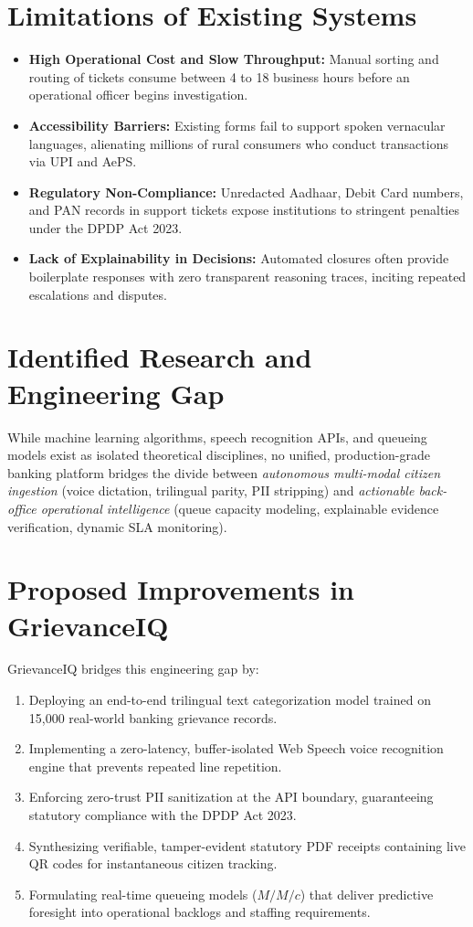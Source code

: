 \section{Limitations of Existing Systems}
\begin{itemize}
    \item \textbf{High Operational Cost and Slow Throughput:} Manual sorting and routing of tickets consume between 4 to 18 business hours before an operational officer begins investigation.
    \item \textbf{Accessibility Barriers:} Existing forms fail to support spoken vernacular languages, alienating millions of rural consumers who conduct transactions via UPI and AePS.
    \item \textbf{Regulatory Non-Compliance:} Unredacted Aadhaar, Debit Card numbers, and PAN records in support tickets expose institutions to stringent penalties under the DPDP Act 2023.
    \item \textbf{Lack of Explainability in Decisions:} Automated closures often provide boilerplate responses with zero transparent reasoning traces, inciting repeated escalations and disputes.
\end{itemize}

\section{Identified Research and Engineering Gap}
While machine learning algorithms, speech recognition APIs, and queueing models exist as isolated theoretical disciplines, no unified, production-grade banking platform bridges the divide between \textit{autonomous multi-modal citizen ingestion} (voice dictation, trilingual parity, PII stripping) and \textit{actionable back-office operational intelligence} (queue capacity modeling, explainable evidence verification, dynamic SLA monitoring).

\section{Proposed Improvements in GrievanceIQ}
GrievanceIQ bridges this engineering gap by:
\begin{enumerate}
    \item Deploying an end-to-end trilingual text categorization model trained on 15,000 real-world banking grievance records.
    \item Implementing a zero-latency, buffer-isolated Web Speech voice recognition engine that prevents repeated line repetition.
    \item Enforcing zero-trust PII sanitization at the API boundary, guaranteeing statutory compliance with the DPDP Act 2023.
    \item Synthesizing verifiable, tamper-evident statutory PDF receipts containing live QR codes for instantaneous citizen tracking.
    \item Formulating real-time queueing models ($M/M/c$) that deliver predictive foresight into operational backlogs and staffing requirements.
\end{enumerate}
